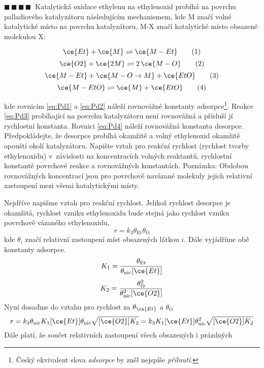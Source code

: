\documentclass{book}
\newcommand{\ctyri}{$\blacksquare \, \blacksquare \, \blacksquare \, \blacksquare \; \; $}
\renewenvironment{quotation}{\par}{\par} %
\begin{document}
\hrulefill %
\begin{quotation}
\ctyri Katalytická oxidace ethylenu na ethylenoxid probíhá na povrchu palladiového
katalyzátoru následujícím mechanismem, kde M značí volné katalytické
místo na povrchu katalyzátoru, M-X značí katalytické místo obsazené
molekulou X: 

\[
\ce{Et}+\ce{M} \rightleftharpoons \ce{M-Et} \tag{1} \label{eq:Pd1}
\]
\[
\ce{O2}+\ce{2M} \rightleftharpoons 2\,\ce{M-O} \tag{2} \label{eq:Pd2}
\]
\[
\ce{M-Et}+\ce{M-O\rightarrow M}+\ce{EtO} \tag{3} \label{eq:Pd3}
\]
\[
\ce{M-EtO} \rightleftharpoons \ce{M}+\ce{EtO} \tag{4} \label{eq:Pd4}
\]

kde rovnicím \eqref{eq:Pd1} a \eqref{eq:Pd2} náleží rovnovážné konstanty adsorpce\footnote{Český ekvivalent slova \textit{adsorpce} by zněl nejspíše \textit{přilnutí}.}. Reakce \eqref{eq:Pd3} probíhající na povrchu katalyzátoru není rovnovážná a přísluší jí rychlostní konstanta. Rovnici \eqref{eq:Pd4} náleží rovnovážná konstanta desorpce.\\
Předpokládejte, že desorpce probíhá okamžitě a volný ethylenoxid okamžitě
opouští okolí katalyzátoru. Napište vztah pro reakční rychlost (rychlost
tvorby ethylenoxidu) v~závislosti na koncentracích volných reaktantů,
rychlostní konstantě povrchové reakce a rovnovážných konstantách.
Poznámka: Obdobou rovnovážných koncentrací jsou pro povrchově navázané
molekuly jejich relativní zastoupení mezi všemi katalytickými místy.
\end{quotation} \dotfill \par 
Nejdříve napišme vztah pro reakční rychlost. Jelikož rychlost desorpce
je okamžitá, rychlost vzniku ethylenoxidu bude stejná jako rychlost
vzniku povrchově vázaného ethylenoxidu, 
\[
r=k_{3}\theta_{\mathrm{Et}}\theta_{\mathrm{O}}
\]
 kde $\theta_{i}$ značí relativní zastoupení míst obsazených látkou
$i$. Dále vyjádříme obě konstanty adsorpce. 
\[
K_{1}=\frac{\theta_{\mathrm{Et}}}{\theta_{\mathrm{nic}}[\ce{Et}]}
\]
\[
K_{2}=\frac{\theta_{\mathrm{O}}^{2}}{\theta_{\mathrm{nic}}^{2}[\ce{O2}]}
\]
 Nyní dosaďme do vztahu pro rychlost za $\theta{}_{\ce{Et}}$ a $\theta_{\mathrm{O}}$
\[
r=k_{3}\theta_{\mathrm{nic}}K_{1}[\ce{Et}]\theta_{\mathrm{nic}}\sqrt{[\ce{O2}]K_{2}}=k_{3}K_{1}[\ce{Et}]\theta_{\mathrm{nic}}^{2}\sqrt{[\ce{O2}]K_{2}}
\]
 Dále platí, že součet relativních zastoupení všech obsazených i prázdných
\end{document}
